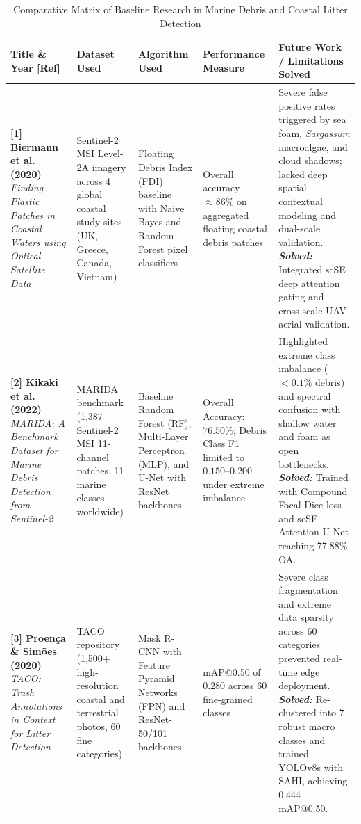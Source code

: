 \documentclass[conference]{IEEEtran}
\begin{document}
\begin{table}[t!]
\centering
\caption{Comparative Matrix of Baseline Research in Marine Debris and Coastal Litter Detection}
\label{tab:lit_survey}
\small
\renewcommand{\arraystretch}{1.2}
\begin{tabularx}{\textwidth}{L{3.0cm} L{2.4cm} L{2.6cm} L{2.5cm} Y}
\toprule
\textbf{Title \& Year [Ref]} & \textbf{Dataset Used} & \textbf{Algorithm Used} & \textbf{Performance Measure} & \textbf{Future Work / Limitations Solved} \\
\midrule

\textbf{[1] Biermann et al. (2020)} \newline
\textit{Finding Plastic Patches in Coastal Waters using Optical Satellite Data}~\cite{biermann2020finding} & 
Sentinel-2 MSI Level-2A imagery across 4 global coastal study sites (UK, Greece, Canada, Vietnam) & 
Floating Debris Index (FDI) baseline with Naive Bayes and Random Forest pixel classifiers & 
Overall accuracy $\approx 86\%$ on aggregated floating coastal debris patches & 
Severe false positive rates triggered by sea foam, \textit{Sargassum} macroalgae, and cloud shadows; lacked deep spatial contextual modeling and dual-scale validation. \newline
\textit{\textbf{Solved:}} Integrated scSE deep attention gating and cross-scale UAV aerial validation. \\
\midrule

\textbf{[2] Kikaki et al. (2022)} \newline
\textit{MARIDA: A Benchmark Dataset for Marine Debris Detection from Sentinel-2}~\cite{kikaki2022marida} & 
MARIDA benchmark (1,387 Sentinel-2 MSI 11-channel patches, 11 marine classes worldwide) & 
Baseline Random Forest (RF), Multi-Layer Perceptron (MLP), and U-Net with ResNet backbones & 
Overall Accuracy: $76.50\%$; Debris Class F1 limited to $0.150$--$0.200$ under extreme imbalance & 
Highlighted extreme class imbalance ($<0.1\%$ debris) and spectral confusion with shallow water and foam as open bottlenecks. \newline
\textit{\textbf{Solved:}} Trained with Compound Focal-Dice loss and scSE Attention U-Net reaching 77.88\% OA. \\
\midrule

\textbf{[3] Proen{\c{c}}a \& Sim{\~o}es (2020)} \newline
\textit{TACO: Trash Annotations in Context for Litter Detection}~\cite{proenca2020taco} & 
TACO repository (1,500+ high-resolution coastal and terrestrial photos, 60 fine categories) & 
Mask R-CNN with Feature Pyramid Networks (FPN) and ResNet-50/101 backbones & 
mAP@0.50 of $0.280$ across 60 fine-grained classes & 
Severe class fragmentation and extreme data sparsity across 60 categories prevented real-time edge deployment. \newline
\textit{\textbf{Solved:}} Re-clustered into 7 robust macro classes and trained YOLOv8s with SAHI, achieving 0.444 mAP@0.50. \\
\midrule


\end{tabularx}
\end{table}
\end{document}
